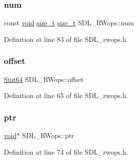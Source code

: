 \mbox{\label{struct_s_d_l___r_wops_a630921d5c84cf48a4a10f9a75e1caa10}} 
\subsubsection{\texorpdfstring{num}{num}}
{\footnotesize\ttfamily const \mbox{\hyperlink{_s_d_l__opengles2__gl2ext_8h_ae5d8fa23ad07c48bb609509eae494c95}{void}} \mbox{\hyperlink{struct_s_d_l___r_wops_acd9a3c6e840d285c1e30cadaf99097b2}{size\+\_\+t}} \mbox{\hyperlink{struct_s_d_l___r_wops_acd9a3c6e840d285c1e30cadaf99097b2}{size\+\_\+t}} S\+D\+L\+\_\+\+R\+Wops\+::num}



Definition at line 83 of file S\+D\+L\+\_\+rwops.\+h.

\mbox{\label{struct_s_d_l___r_wops_ab1ee9d9e4f61b3b30f26160c282ae416}} 
\subsubsection{\texorpdfstring{offset}{offset}}
{\footnotesize\ttfamily \mbox{\hyperlink{_s_d_l__stdinc_8h_a2c1a61d5c466bb74680be0a8cc1b455d}{Sint64}} S\+D\+L\+\_\+\+R\+Wops\+::offset}



Definition at line 65 of file S\+D\+L\+\_\+rwops.\+h.

\mbox{\label{struct_s_d_l___r_wops_a3f68b93789331775de802d51a2934f0a}} 
\subsubsection{\texorpdfstring{ptr}{ptr}\hspace{0.1cm}{\footnotesize\ttfamily [1/2]}}
{\footnotesize\ttfamily \mbox{\hyperlink{_s_d_l__opengles2__gl2ext_8h_ae5d8fa23ad07c48bb609509eae494c95}{void}}$\ast$ S\+D\+L\+\_\+\+R\+Wops\+::ptr}



Definition at line 74 of file S\+D\+L\+\_\+rwops.\+h.

\mbox{\label{struct_s_d_l___r_wops_a51baff579726790887a4ca41ce14873c}} 
